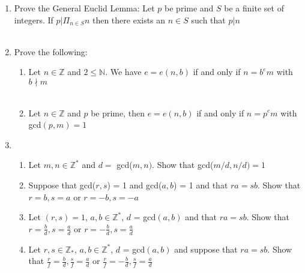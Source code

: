\documentclass[11pt]{article}
\begin{document}
\begin{enumerate}
\begin{enumerate}
\end{enumerate}

\newpage %
\item Prove the General Euclid Lemma: Let $p$ be prime and $S$ be a finite set of integers.  If $p|\Pi_{n \in S}n$ then there exists an $n \in S$ such that $p | n$
\\
\\


\newpage %
\item Prove the following:
\begin{enumerate}
\item Let $n \in \mathbb{Z}$ and $2 \leq \mathbb{N}$.  We have $e = e(n,b)$ if and only if $n = b^em$ with $b \nmid m$\\
\\
\item Let $n \in \mathbb{Z}$ and $p$ be prime, then $e = e(n,b)$ if and only if $n = p^em$ with gcd$(p,m) = 1$
\end{enumerate}


\newpage %
\item 
\begin{enumerate}
\item Let $m,n \in \mathbb{Z}^*$ and $d = $ gcd($m,n)$.  Show that gcd($m/d , n/d) = 1$
\\
\item Suppose that gcd($r,s$) = 1 and gcd($a,b$) = 1 and that $ra = sb$.  Show that $r=b, s = a$ or $r = -b, s = -a$
\\
\item Let $(r,s) = 1$, $a,b \in \mathbb{Z}^*$, $d$ = gcd$(a,b)$ and that $ra = sb$.  Show that $r = \tfrac{b}{d}, s = \tfrac{a}{d}$ or $r = -\tfrac{b}{d}, s=\tfrac{a}{d}$
\\
\item Let $r,s \in \mathbb{Z}_*$, $a,b \in \mathbb{Z}^*$, $d$ = gcd$(a,b)$ and suppose that $ra = sb$.  Show that $\tfrac{r}{f} = \tfrac{b}{d}, \tfrac{s}{f} = \tfrac{a}{d}$ or $\tfrac{r}{f} = -\tfrac{b}{d}, \tfrac{s}{f}=\tfrac{a}{d}$
\end{enumerate}

\end{enumerate} %
\end{document}
